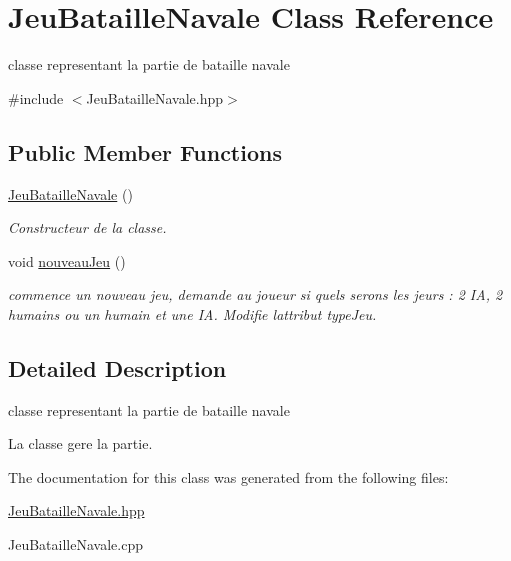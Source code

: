 \hypertarget{class_jeu_bataille_navale}{}\section{Jeu\+Bataille\+Navale Class Reference}
\label{class_jeu_bataille_navale}


classe representant la partie de bataille navale  




{\ttfamily \#include $<$Jeu\+Bataille\+Navale.\+hpp$>$}

\subsection*{Public Member Functions}
\begin{DoxyCompactItemize}
\item 
\mbox{\label{class_jeu_bataille_navale_aae41366decd137f03ac95aff8b8e0f49}} 
\mbox{\hyperlink{class_jeu_bataille_navale_aae41366decd137f03ac95aff8b8e0f49}{Jeu\+Bataille\+Navale}} ()
\begin{DoxyCompactList}\small\item\em Constructeur de la classe. \end{DoxyCompactList}\item 
\mbox{\label{class_jeu_bataille_navale_a3f59d8ee46918984df4a13cd261d5491}} 
void \mbox{\hyperlink{class_jeu_bataille_navale_a3f59d8ee46918984df4a13cd261d5491}{nouveau\+Jeu}} ()
\begin{DoxyCompactList}\small\item\em commence un nouveau jeu, demande au joueur si quels serons les jeurs \+: 2 IA, 2 humains ou un humain et une IA. Modifie l\textquotesingle{}attribut type\+Jeu. \end{DoxyCompactList}\end{DoxyCompactItemize}


\subsection{Detailed Description}
classe representant la partie de bataille navale 

La classe gere la partie. 

The documentation for this class was generated from the following files\+:\begin{DoxyCompactItemize}
\item 
\mbox{\hyperlink{_jeu_bataille_navale_8hpp}{Jeu\+Bataille\+Navale.\+hpp}}\item 
Jeu\+Bataille\+Navale.\+cpp\end{DoxyCompactItemize}
